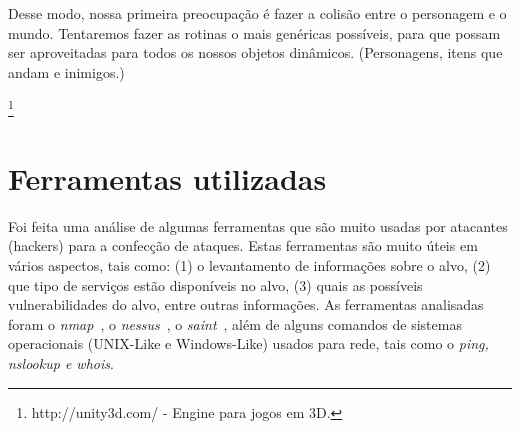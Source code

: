 \documentclass[brazil]{abnt}
\begin{document}
Desse modo, nossa primeira preocupação é fazer a colisão entre o personagem e o mundo. Tentaremos fazer as rotinas o mais genéricas possíveis, para que possam ser aproveitadas para todos os nossos objetos dinâmicos. (Personagens, itens que andam e inimigos.)

\footnote{http://unity3d.com/ - Engine para jogos em 3D.}

\chapter{Ferramentas utilizadas}

Foi feita uma análise de algumas ferramentas que são muito usadas
por atacantes (hackers) para a confecção de ataques. Estas ferramentas
são muito úteis em vários aspectos, tais como: (1) o levantamento
de informações sobre o alvo, (2) que tipo de serviços estão disponíveis
no alvo, (3) quais as possíveis vulnerabilidades do alvo, entre outras
informações. As ferramentas analisadas foram o \emph{nmap}~,
o \emph{nessus}~, o \emph{saint}~, além
de alguns comandos de sistemas operacionais (UNIX-Like e Windows-Like)
usados para rede, tais como o \emph{ping, nslookup e whois}. 
\end{document}
